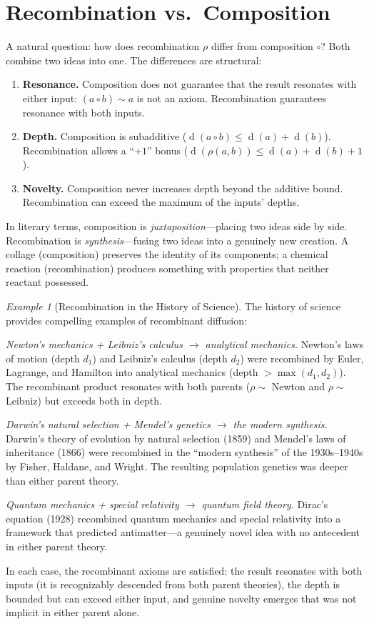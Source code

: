 \documentclass[11pt,openany]{book}
\theoremstyle{definition}
\theoremstyle{plain}
\theoremstyle{remark}
\newtheorem{example}[axiom]{Example}
\newcommand{\compose}{\circ}                 %
\newcommand{\res}{\sim}                      %
\newcommand{\depth}{\operatorname{d}}       %
\begin{document}
\section{Recombination vs.\ Composition}

A natural question: how does recombination $\rho$ differ from composition $\compose$? Both combine two ideas into one. The differences are structural:

\begin{enumerate}
\item \textbf{Resonance.} Composition does not guarantee that the result resonates with either input: $(a \compose b) \res a$ is not an axiom. Recombination guarantees resonance with both inputs.
\item \textbf{Depth.} Composition is subadditive ($\depth(a \compose b) \leq \depth(a) + \depth(b)$). Recombination allows a ``$+1$'' bonus ($\depth(\rho(a, b)) \leq \depth(a) + \depth(b) + 1$).
\item \textbf{Novelty.} Composition never increases depth beyond the additive bound. Recombination can exceed the maximum of the inputs' depths.
\end{enumerate}

In literary terms, composition is \emph{juxtaposition}---placing two ideas side by side. Recombination is \emph{synthesis}---fusing two ideas into a genuinely new creation. A collage (composition) preserves the identity of its components; a chemical reaction (recombination) produces something with properties that neither reactant possessed.

\begin{example}[Recombination in the History of Science]
The history of science provides compelling examples of recombinant diffusion:

\emph{Newton's mechanics + Leibniz's calculus $\to$ analytical mechanics.} Newton's laws of motion (depth $d_1$) and Leibniz's calculus (depth $d_2$) were recombined by Euler, Lagrange, and Hamilton into analytical mechanics (depth $> \max(d_1, d_2)$). The recombinant product resonates with both parents ($\rho \res$ Newton and $\rho \res$ Leibniz) but exceeds both in depth.

\emph{Darwin's natural selection + Mendel's genetics $\to$ the modern synthesis.} Darwin's theory of evolution by natural selection (1859) and Mendel's laws of inheritance (1866) were recombined in the ``modern synthesis'' of the 1930s--1940s by Fisher, Haldane, and Wright. The resulting population genetics was deeper than either parent theory.

\emph{Quantum mechanics + special relativity $\to$ quantum field theory.} Dirac's equation (1928) recombined quantum mechanics and special relativity into a framework that predicted antimatter---a genuinely novel idea with no antecedent in either parent theory.

In each case, the recombinant axioms are satisfied: the result resonates with both inputs (it is recognizably descended from both parent theories), the depth is bounded but can exceed either input, and genuine novelty emerges that was not implicit in either parent alone.
\end{example}
\end{document}
